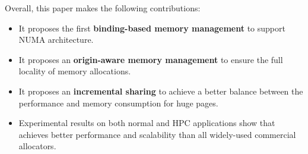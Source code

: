 Overall, this paper makes the following contributions:

\begin{itemize}

 \item It proposes the first \textbf{binding-based memory management} to support NUMA architecture.

\item It proposes an \textbf{origin-aware memory management} to ensure the full locality of memory allocations. 

\item It proposes an \textbf{incremental sharing} to achieve a better balance between the performance and memory consumption for huge pages. 



\item Experimental results on both normal and HPC applications show that \NM{} achieves better performance and scalability than all widely-used commercial allocators. 




\end{itemize}

